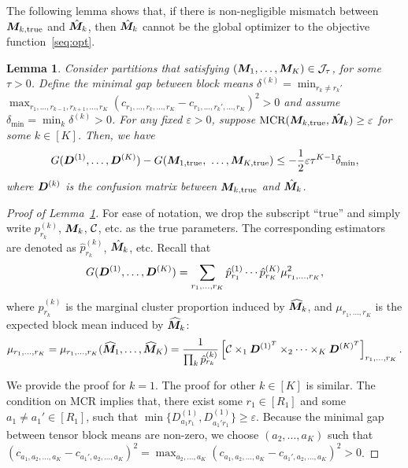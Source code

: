 \documentclass{article}
\newtheorem{lemma}{Lemma}
\begin{document}
\begin{appendices}
\begin{enumerate}
\end{enumerate}

The following lemma shows that, if there is non-negligible mismatch between $\bm M_{k,\text{true}}$ and $\hat {\bm M}_k$, then $\hat {\bm M}_k$ cannot be the global optimizer to the objective function~\eqref{seq:opt}.

\begin{lemma}\label{1}
Consider partitions that satisfying $(\bm M_1,\ldots,\bm M_K)\in \mathcal{J}_\tau$, for some $\tau>0$. 
Define the minimal gap between block means $\delta^{(k)}=\min_{r_k\neq r_k'}$ $\max_{r_1,\ldots,r_{k-1},r_{k+1},\ldots,r_K}(c_{r_1,\ldots,r_k,\ldots,r_K}-c_{r_1,\ldots,r_k',\ldots,r_K})^2>0$ and assume $\delta_{\min}=\min_k\delta^{(k)}>0$. For any fixed $\varepsilon>0$, suppose $\text{MCR}(\bm M_{k,\text{true}}, \hat {\bm M}_k)\geq \varepsilon $ for some $k\in[K]$. Then, we have
\begin{equation*}
    G(\mD^{(1)},\ldots,\mD^{(K)})-G(\mM_{1,\text{true}},\ \ldots,\mM_{K,\text{true}}) \leq -\frac{1}{2}\varepsilon\tau^{K-1}\delta_{\min},
\end{equation*}
where $\bm{D}^{(k)}$ is the confusion matrix between $\bm M_{k,\text{true}}$ and $\hat {\bm M}_k$.
\end{lemma}

\begin{proof}[Proof of Lemma~\ref{1}]
For ease of notation, we drop the subscript ``true'' and simply write $p^{(k)}_{r_k}$, $\bm M_k$, $\mathcal{C}$, etc. as the true parameters. The corresponding estimators are denoted as $\hat p^{(k)}_{r_k}$, $\hat {\bm M}_k$, etc.
Recall that 
\begin{equation}\label{eq:D}
G(\bm{D}^{(1)},\ldots,\bm{D}^{(K)})=\sum_{r_1,\ldots,r_K} \hat p^{(1)}_{r_1}\cdots \hat p^{(K)}_{r_K}  \mu^2_{r_1,\ldots,r_K},
\end{equation}
where  $\hat p^{(k)}_{r_k}$ is the marginal cluster proportion induced by $\widehat{\bm M}_k$, and $\mu_{r_1,\ldots,r_K}$ is the expected block mean induced by $\widehat{\bm M}_k$:
\[
\mu_{r_1,\ldots,r_K}=\mu_{r_1,\ldots,r_K}(\widehat{\bm M}_1,\ldots,\widehat{\bm M}_K)={1\over \prod_k \hat p^{(k)}_{r_k}}\left[ \mathcal{C}\times_1 \bm{D}^{(1)^T} \times_2\cdots\times_K \bm{D}^{(K)^T}\right]_{r_1,\ldots,r_K}.
\]


We provide the proof for $k=1$. The proof for other $k\in[K]$ is similar. The condition on MCR implies that, there exist some $r_1\in[R_1]$ and some $a_1\neq a_1'\in[R_1]$, such that $\min\{D_{a_1r_1}^{(1)}, D_{a_1'r_1}^{(1)}\}\geq \varepsilon$. Because the minimal gap between tensor block means are non-zero, we choose $(a_2,\ldots,a_K)$ such that $(c_{a_1,a_2,\ldots,a_K}-c_{a_1',a_2,\ldots,a_K})^2 = \displaystyle\max_{a_2,\ldots,a_K}(c_{a_1,a_2,\ldots,a_K}-c_{a_1',a_2,\ldots,a_K})^2>0$. 


\end{proof}
\end{appendices}
\end{document}
